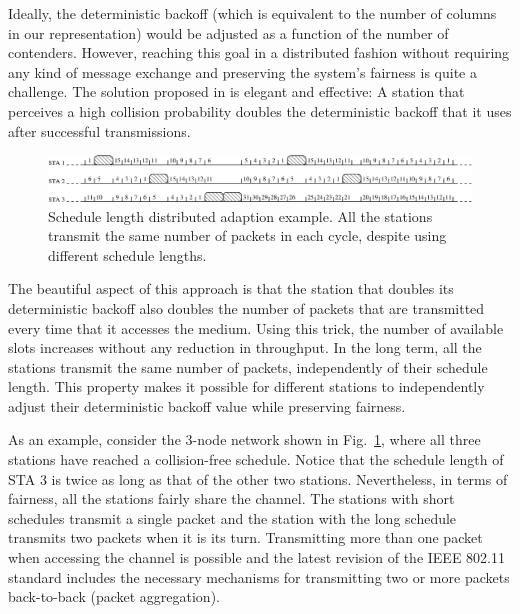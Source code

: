 \documentclass[journal]{IEEEtran}
\begin{document}
Ideally, the deterministic backoff (which is equivalent to the number of columns in our representation) would be adjusted as a function of the number of contenders.
However, reaching this goal in a distributed fashion without requiring any kind of message exchange and preserving the system's fairness is quite a challenge.
The solution proposed in \cite{fang2011dlm} is elegant and effective:
A station that perceives a high collision probability doubles the deterministic backoff that it uses after successful transmissions.

\begin{figure}[!t]
\centering
\includegraphics[width=6.0in]{figures/csma_eca_different_backoff}
\caption{Schedule length distributed adaption example. All the stations transmit the same number of packets in each cycle, despite using different schedule lengths.}
\label{fig:csma_eca_different_backoff}
\end{figure}

The beautiful aspect of this approach is that the station that doubles its deterministic backoff also doubles the number of packets that are transmitted every time that it accesses the medium.
Using this trick, the number of available slots increases without any reduction in throughput.
In the long term, all the stations transmit the same number of packets, independently of their schedule length.
This property makes it possible for different stations to independently adjust their deterministic backoff value while preserving fairness.

As an example, consider the 3-node network shown in Fig.~\ref{fig:csma_eca_different_backoff}, where all three stations have reached a collision-free schedule.
Notice that the schedule length of STA 3 is twice as long as that of the other two stations.
Nevertheless, in terms of fairness, all the stations fairly share the channel.
The stations with short schedules transmit a single packet and the station with the long schedule transmits two packets when it is its turn.
Transmitting more than one packet when accessing the channel is possible and the latest revision of the IEEE 802.11 standard includes the necessary mechanisms for transmitting two or more packets back-to-back (packet aggregation).
\end{document}
